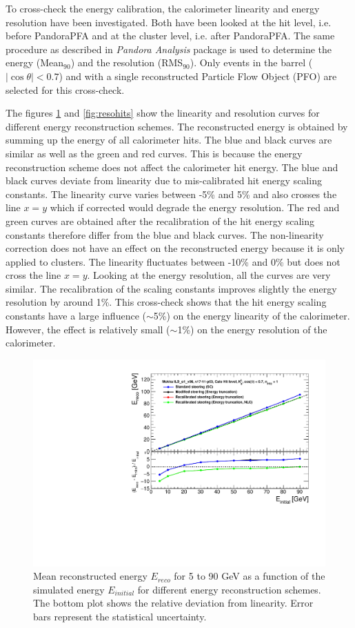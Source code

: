To cross-check the energy calibration, the calorimeter linearity and energy resolution have been investigated. Both have been looked at the hit level, i.e. before PandoraPFA and at the cluster level, i.e. after PandoraPFA. The same procedure as described in \textit{Pandora Analysis} package is used to determine the energy (Mean$_{90}$) and the resolution (RMS$_{90}$). Only events in the barrel ($|\cos\theta| < 0.7$) and with a single reconstructed Particle Flow Object (PFO) are selected for this cross-check.

The figures \ref{fig:linhits} and \ref{fig:resohits} show the linearity and resolution curves for different energy reconstruction schemes. The reconstructed energy is obtained by summing up the energy of all calorimeter hits. The blue and black curves are similar as well as the green and red curves. This is because the energy reconstruction scheme does not affect the calorimeter hit energy. The blue and black curves deviate from linearity due to mis-calibrated hit energy scaling constants. The linearity curve varies between -5\% and 5\% and also crosses the line $x=y$ which if corrected would degrade the energy resolution. The red and green curves are obtained after the recalibration of the hit energy scaling constants therefore differ from the blue and black curves. The non-linearity correction does not have an effect on the reconstructed energy because it is only applied to clusters. The linearity fluctuates between -10\% and 0\% but does not cross the line $x=y$. Looking at the energy resolution, all the curves are very similar. The recalibration of the scaling constants improves slightly the energy resolution by around 1\%. This cross-check shows that the hit energy scaling constants have a large influence ($\sim$5\%) on the energy linearity of the calorimeter. However, the effect is relatively small ($\sim$1\%) on the energy resolution of the calorimeter.

\begin{figure}[htbp!]
  \centering
  \includegraphics[width=0.7\linewidth]{../Thesis_Plots/ILD/NoSmearing/Plots_Comparison/Comparison_linearity_Curves_Hits}
  \caption{Mean reconstructed energy $E_{reco}$ for 5 to 90 GeV \kzeroL{} as a function of the simulated energy $E_{initial}$ for different energy reconstruction schemes. The bottom plot shows the relative deviation from linearity. Error bars represent the statistical uncertainty.} \label{fig:linhits}
\end{figure}

